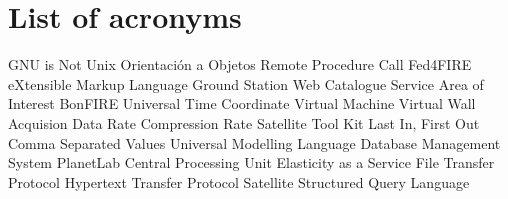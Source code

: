 \chapter{List of acronyms}

{\small
\begin{acronym}[XXXXXXXX]
       {\acs{GNU} is Not Unix}
        {Orientación a Objetos}
       {Remote Procedure Call}
       {Fed4FIRE}
      {eXtensible Markup Language}
      {Ground Station}
      {Web Catalogue Service}
     {Area of Interest}
      {BonFIRE}
    {Universal Time Coordinate}
     {Virtual Machine}
     {Virtual Wall}
    {Acquision Data Rate}
     {Compression Rate}
    {Satellite Tool Kit}
   {Last In, First Out}
    {Comma Separated Values}
    {Universal Modelling Language}
   {Database Management System}
     {PlanetLab}
    {Central Processing Unit}
   {Elasticity as a Service}
    {File Transfer Protocol}
   {Hypertext Transfer Protocol}
    {Satellite}
    {Structured Query Language}
\end{acronym}
}




